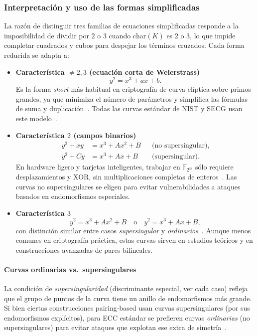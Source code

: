 \subsubsection*{Interpretación y uso de las formas simplificadas}

La razón de distinguir tres familias de ecuaciones simplificadas responde a la imposibilidad de dividir por \(2\) o \(3\) cuando \(\mathrm{char}(K)\) es \(2\) o \(3\), lo que impide completar cuadrados y cubos para despejar los términos cruzados. Cada forma reducida se adapta a:
\begin{itemize}
  \item \textbf{Característica \(\neq2,3\) (ecuación corta de Weierstrass)}  
    \[
      y^2 = x^3 + ax + b.
    \]
    Es la forma \emph{short} más habitual en criptografía de curva elíptica sobre primos grandes, ya que minimiza el número de parámetros y simplifica las fórmulas de suma y duplicación~\cite{SilvermanAEC}. Todas las curvas estándar de NIST y SECG usan este modelo~\cite{NIST-SP-800-186}.
  \item \textbf{Característica \(2\) (campos binarios)}  
    \begin{align*}
      y^2 + x y &= x^3 + A x^2 + B
      &&\text{(no supersingular)},\\
      y^2 + C y &= x^3 + A x + B
      &&\text{(supersingular)}.
    \end{align*}
    En hardware ligero y tarjetas inteligentes, trabajar en \(\mathbb{F}_{2^m}\) sólo requiere desplazamientos y XOR, sin multiplicaciones completas de enteros~\cite{KoblitzBinary}. Las curvas no supersingulares se eligen para evitar vulnerabilidades a ataques basados en endomorfismos especiales.
  \item \textbf{Característica \(3\)}  
    \[
      y^2 = x^3 + A x^2 + B
      \quad\text{o}\quad
      y^2 = x^3 + A x + B,
    \]
    con distinción similar entre casos \emph{supersingular} y \emph{ordinarios}~\cite{SilvermanAEC}. Aunque menos comunes en criptografía práctica, estas curvas sirven en estudios teóricos y en construcciones avanzadas de pares bilineales.
\end{itemize}

\paragraph{Curvas ordinarias vs.\ supersingulares}  
La condición de \emph{supersingularidad} (discriminante especial, ver cada caso) refleja que el grupo de puntos de la curva tiene un anillo de endomorfismos más grande. Si bien ciertas construcciones pairing‐based usan curvas supersingulares (por sus endomorfismos explícitos), para ECC estándar se prefieren curvas \emph{ordinarias} (no supersingulares) para evitar ataques que explotan ese extra de simetría~\cite{Waterhouse1969}.  


